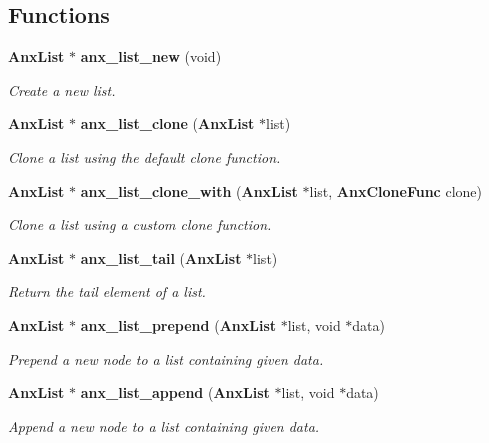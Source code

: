 \subsection*{Functions}
\begin{CompactItemize}
\item 
{\bf Anx\-List} $\ast$ {\bf anx\_\-list\_\-new} (void)
\begin{CompactList}\small\item\em Create a new list. \item\end{CompactList}\item 
{\bf Anx\-List} $\ast$ {\bf anx\_\-list\_\-clone} ({\bf Anx\-List} $\ast$list)
\begin{CompactList}\small\item\em Clone a list using the default clone function. \item\end{CompactList}\item 
{\bf Anx\-List} $\ast$ {\bf anx\_\-list\_\-clone\_\-with} ({\bf Anx\-List} $\ast$list, {\bf Anx\-Clone\-Func} clone)
\begin{CompactList}\small\item\em Clone a list using a custom clone function. \item\end{CompactList}\item 
{\bf Anx\-List} $\ast$ {\bf anx\_\-list\_\-tail} ({\bf Anx\-List} $\ast$list)
\begin{CompactList}\small\item\em Return the tail element of a list. \item\end{CompactList}\item 
{\bf Anx\-List} $\ast$ {\bf anx\_\-list\_\-prepend} ({\bf Anx\-List} $\ast$list, void $\ast$data)
\begin{CompactList}\small\item\em Prepend a new node to a list containing given data. \item\end{CompactList}\item 
{\bf Anx\-List} $\ast$ {\bf anx\_\-list\_\-append} ({\bf Anx\-List} $\ast$list, void $\ast$data)
\begin{CompactList}\small\item\em Append a new node to a list containing given data. \item\end{CompactList}\item 

\end{CompactItemize}
